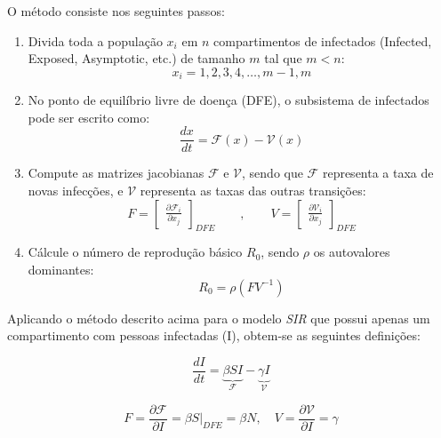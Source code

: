 O método consiste nos seguintes passos:

\begin{enumerate}
    \item Divida toda a população $x_i$ em $n$ compartimentos de infectados 
    (Infected, Exposed, Asymptotic, etc.) de tamanho $m$ tal que $m < n$:
    \begin{equation}
        x_i = 1, 2, 3, 4, \dots, m-1, m
    \end{equation}
    \item No ponto de equilíbrio livre de doença (DFE), o subsistema de infectados pode
    ser escrito como:
    \begin{equation}
        \frac{dx}{dt} = \mathcal{F}(x) - \mathcal{V}(x)
    \end{equation}
    \item Compute as matrizes jacobianas $\mathcal{F}$ e $\mathcal{V}$, 
    sendo que $\mathcal{F}$ representa a taxa de novas infecções, e $\mathcal{V}$
    representa as taxas das outras transições:
    \begin{equation}
        F = \begin{bmatrix}
            \frac{\partial\mathcal{F}_i}{\partial x_j}
        \end{bmatrix}_{DFE}
        \qquad,
        \qquad
        V = \begin{bmatrix}
            \frac{\partial\mathcal{V}_i}{\partial x_j}
        \end{bmatrix}_{DFE}
    \end{equation}
    \item Cálcule o número de reprodução básico $R_0$, sendo $\rho$ os autovalores
    dominantes:
    \begin{equation}
        R_0 = \rho(FV^{-1})
    \end{equation}
\end{enumerate}

Aplicando o método descrito acima para o modelo \textit{SIR} que possui apenas um
compartimento com pessoas infectadas (I), obtem-se as seguintes definições:

\begin{equation}
\frac{dI}{dt} = \underbrace{\beta SI}_{\mathcal{F}} - \underbrace{\gamma I}_{\mathcal{V}}
\end{equation}

\begin{equation}
F = \frac{\partial \mathcal{F}}{\partial I} = \beta S\big|_{DFE} = \beta N, \quad 
V = \frac{\partial \mathcal{V}}{\partial I} = \gamma
\end{equation}

